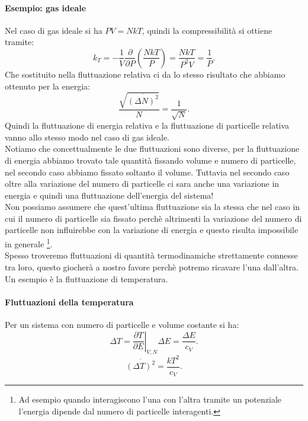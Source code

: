 \paragraph{Esempio: gas ideale}%
Nel caso di gas ideale si ha $PV=NkT$, quindi la compressibilità si ottiene tramite:
\[
	k_{T} =- \frac{1}{V}\frac{\partial }{\partial P} \left( \frac{NkT}{P} \right) = \frac{NkT}{P^2V}=   \frac{1}{P} 
.\] 
Che sostituito nella fluttuazione relativa ci da lo stesso risultato che abbiamo ottenuto per la energia:
\[
	\frac{\sqrt{\overline{\left( \Delta N \right) ^2}} }{N} = \frac{1}{\sqrt{N} }
.\] 
Quindi la fluttuazione di energia relativa e la fluttuazione di particelle relativa vanno allo stesso modo nel caso di gas ideale.\\
Notiamo che concettualmente le due fluttuazioni sono diverse, per la fluttuazione di energia abbiamo trovato tale quantità fissando volume e numero di particelle, nel secondo caso abbiamo fissato soltanto il volume. Tuttavia nel secondo caso oltre alla variazione del numero di particelle ci sara anche una variazione in energia e quindi una fluttuazione dell'energia del sistema!\\
Non possiamo assumere che quest'ultima fluttuazione sia la stessa che nel caso in cui il numero di particelle sia fissato perchè altrimenti la variazione del numero di particelle non influirebbe con la variazione di energia e questo risulta impossibile in generale \footnote{Ad esempio quando interagiscono l'una con l'altra tramite un potenziale l'energia dipende dal numero di particelle interagenti.}.\\
Spesso troveremo fluttuazioni di quantità termodinamiche strettamente connesse tra loro, questo giocherà a nostro favore perchè potremo ricavare l'una dall'altra. Un esempio è la fluttuazione di temperatura.
\paragraph{Fluttuazioni della temperatura}%
Per un sistema con numero di particelle e volume costante si ha:
\[
	\Delta T = \left.\frac{\partial T}{\partial E} \right|_{V,N}\Delta E= \frac{\Delta E}{c_{V}}
.\] 
\[
	\overline{\left( \Delta T\right) ^2} = \frac{kT^2}{c_{V}}
.\] 
